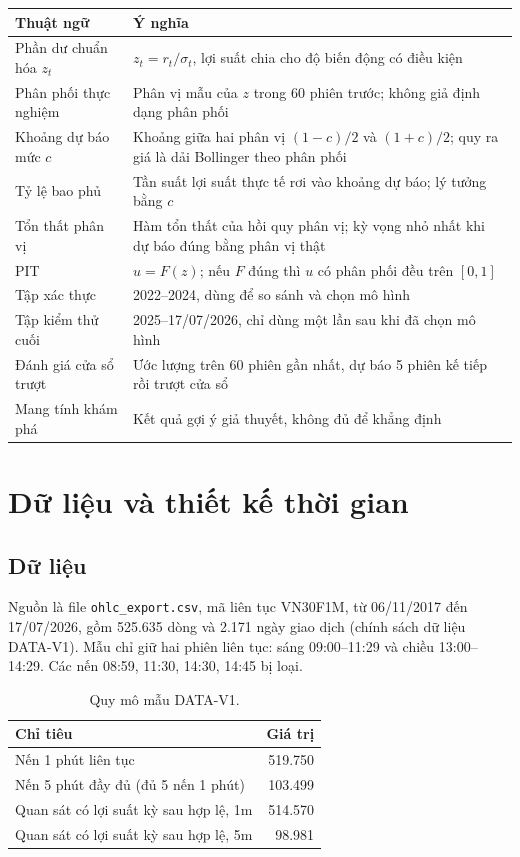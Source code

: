 \documentclass[11pt,a4paper]{article}
\begin{document}
\begin{table}[h]
\centering
\small
\begin{tabularx}{\linewidth}{lX}
\toprule
Thuật ngữ & Ý nghĩa \\
\midrule
Phần dư chuẩn hóa $z_t$ & $z_t=r_t/\sigma_t$, lợi suất chia cho độ biến động có điều kiện \\
Phân phối thực nghiệm & Phân vị mẫu của $z$ trong 60 phiên trước; không giả định dạng phân phối \\
Khoảng dự báo mức $c$ & Khoảng giữa hai phân vị $(1-c)/2$ và $(1+c)/2$; quy ra giá là dải Bollinger theo phân phối \\
Tỷ lệ bao phủ & Tần suất lợi suất thực tế rơi vào khoảng dự báo; lý tưởng bằng $c$ \\
Tổn thất phân vị & Hàm tổn thất của hồi quy phân vị; kỳ vọng nhỏ nhất khi dự báo đúng bằng phân vị thật \\
PIT & $u=F(z)$; nếu $F$ đúng thì $u$ có phân phối đều trên $[0,1]$ \\
Tập xác thực & 2022--2024, dùng để so sánh và chọn mô hình \\
Tập kiểm thử cuối & 2025--17/07/2026, chỉ dùng một lần sau khi đã chọn mô hình \\
Đánh giá cửa sổ trượt & Ước lượng trên 60 phiên gần nhất, dự báo 5 phiên kế tiếp rồi trượt cửa sổ \\
Mang tính khám phá & Kết quả gợi ý giả thuyết, không đủ để khẳng định \\
\bottomrule
\end{tabularx}
\end{table}

\section{Dữ liệu và thiết kế thời gian}

\subsection{Dữ liệu}

Nguồn là file \texttt{ohlc\_export.csv}, mã liên tục VN30F1M, từ 06/11/2017 đến 17/07/2026, gồm 525.635 dòng và 2.171 ngày giao dịch (chính sách dữ liệu DATA-V1). Mẫu chỉ giữ hai phiên liên tục: sáng 09:00--11:29 và chiều 13:00--14:29. Các nến 08:59, 11:30, 14:30, 14:45 bị loại.

\begin{table}[h]
\centering
\small
\caption{Quy mô mẫu DATA-V1.}
\begin{tabular}{lr}
\toprule
Chỉ tiêu & Giá trị \\
\midrule
Nến 1 phút liên tục & 519.750 \\
Nến 5 phút đầy đủ (đủ 5 nến 1 phút) & 103.499 \\
Quan sát có lợi suất kỳ sau hợp lệ, 1m & 514.570 \\
Quan sát có lợi suất kỳ sau hợp lệ, 5m & 98.981 \\
\bottomrule
\end{tabular}
\end{table}
\end{document}
